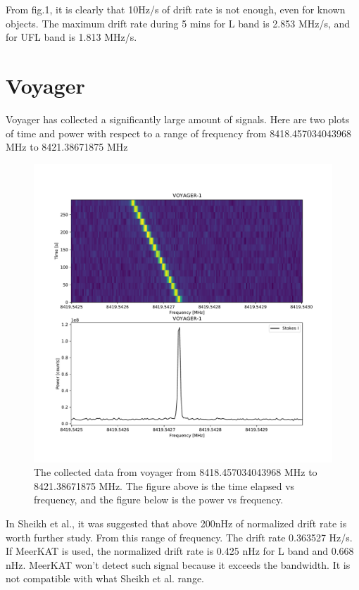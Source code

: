 \documentclass{article}
\begin{document}
From fig.1, it is clearly that 10Hz/s of drift rate is not enough, even for known objects. The maximum drift rate during 5 mins for L band is 2.853 MHz/s, and for UFL band is 1.813 MHz/s.

\section{Voyager}
Voyager has collected a significantly large amount of signals. Here are two plots of time and power with respect to a range of frequency from 8418.457034043968 MHz to 8421.38671875 MHz

\begin{figure}[H]
    \centering
    \includegraphics[scale=0.4]{voyager.pdf}
    \caption{The collected data from voyager from 8418.457034043968 MHz to 8421.38671875 MHz. The figure above is the time elapsed vs frequency, and the figure below is the power vs frequency.}
    \label{fig:2}
\end{figure}

In Sheikh et al., it was suggested that above 200nHz of normalized drift rate is worth further study. From this range of frequency. The drift rate 0.363527 Hz/s. If MeerKAT is used, the normalized drift rate is 0.425 nHz for L band and 0.668 nHz. MeerKAT won't detect such signal because it exceeds the bandwidth. It is not compatible with what Sheikh et al. range.
\end{document}
